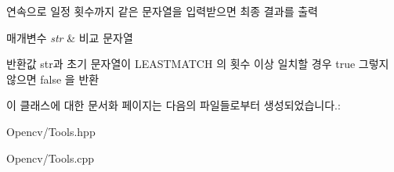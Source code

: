 연속으로 일정 횟수까지 같은 문자열을 입력받으면 최종 결과를 출력 


\begin{DoxyParams}{매개변수}
{\em str} & 비교 문자열 \\
\hline
\end{DoxyParams}
\begin{DoxyReturn}{반환값}
str과 초기 문자열이 L\+E\+A\+S\+T\+M\+A\+T\+CH 의 횟수 이상 일치할 경우 true 그렇지 않으면 false 을 반환 
\end{DoxyReturn}


이 클래스에 대한 문서화 페이지는 다음의 파일들로부터 생성되었습니다.\+:\begin{DoxyCompactItemize}
\item 
Opencv/Tools.\+hpp\item 
Opencv/Tools.\+cpp\end{DoxyCompactItemize}

